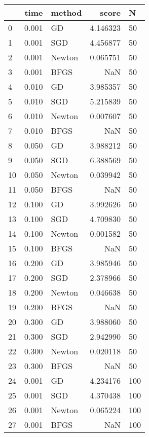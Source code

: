 \begin{tabular}{lrlrl}
\toprule
{} &   time &  method &     score &        N \\
\midrule
0   &  0.001 &      GD &  4.146323 &       50 \\
1   &  0.001 &     SGD &  4.456877 &       50 \\
2   &  0.001 &  Newton &  0.065751 &       50 \\
3   &  0.001 &    BFGS &       NaN &       50 \\
4   &  0.010 &      GD &  3.985357 &       50 \\
5   &  0.010 &     SGD &  5.215839 &       50 \\
6   &  0.010 &  Newton &  0.007607 &       50 \\
7   &  0.010 &    BFGS &       NaN &       50 \\
8   &  0.050 &      GD &  3.988212 &       50 \\
9   &  0.050 &     SGD &  6.388569 &       50 \\
10  &  0.050 &  Newton &  0.039942 &       50 \\
11  &  0.050 &    BFGS &       NaN &       50 \\
12  &  0.100 &      GD &  3.992626 &       50 \\
13  &  0.100 &     SGD &  4.709830 &       50 \\
14  &  0.100 &  Newton &  0.001582 &       50 \\
15  &  0.100 &    BFGS &       NaN &       50 \\
16  &  0.200 &      GD &  3.985946 &       50 \\
17  &  0.200 &     SGD &  2.378966 &       50 \\
18  &  0.200 &  Newton &  0.046638 &       50 \\
19  &  0.200 &    BFGS &       NaN &       50 \\
20  &  0.300 &      GD &  3.988060 &       50 \\
21  &  0.300 &     SGD &  2.942990 &       50 \\
22  &  0.300 &  Newton &  0.020118 &       50 \\
23  &  0.300 &    BFGS &       NaN &       50 \\
24  &  0.001 &      GD &  4.234176 &      100 \\
25  &  0.001 &     SGD &  4.370438 &      100 \\
26  &  0.001 &  Newton &  0.065224 &      100 \\
27  &  0.001 &    BFGS &       NaN &      100 \\

\end{tabular}
